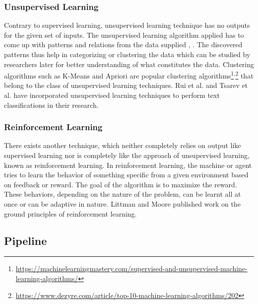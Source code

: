 \documentclass[a4paper,12pt,twoside]{report}
\begin{document}
\subsubsection{Unsupervised Learning}  
Contrary to supervised learning, unsupervised learning technique has no outputs for the given set of inputs. The unsupervised learning algorithm applied has to come up with patterns and relations from the data supplied \cite{Ball2011}, \cite{Rojas1996}. The discovered patterns thus help in categorizing or clustering the data which can be studied by researchers later for better understanding of what constitutes the data. Clustering algorithms such as K-Means and Apriori are popular clustering algorithms\footnote{\url{https://machinelearningmastery.com/supervised-and-unsupervised-machine-learning-algorithms/}}\textsuperscript{,}\footnote{\url{https://www.dezyre.com/article/top-10-machine-learning-algorithms/202}} that belong to the class of unsupervised learning techniques. Rui et al.\cite{Rui2016} and Tsarev et al. \cite{Tsarev2011} have incorporated unsupervised learning techniques to perform text classifications in their research. 

\subsubsection{Reinforcement Learning} 
There exists another technique, which neither completely relies on output like supervised learning nor is completely like the approach of unsupervised learning, known as reinforcement learning. In reinforcement learning, the machine or agent tries to learn the behavior of something specific from a given environment based on feedback or reward. The goal of the algorithm is to maximize the reward. These behaviors, depending on the nature of the problem, can be learnt all at once or can be adaptive in nature. Littman and Moore \cite{Littman1996} published work on the ground principles of reinforcement learning. 

\subsection{Pipeline}
\end{document}
